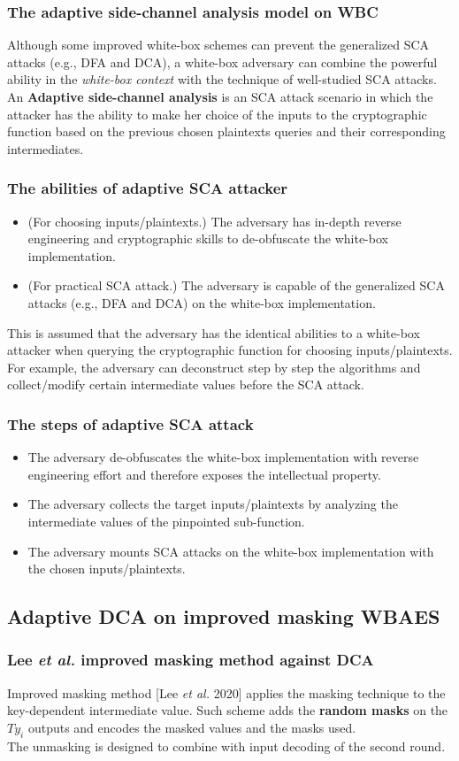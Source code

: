 \documentclass{beamer}
\begin{document}
\frame
{
	\frametitle{The adaptive side-channel analysis model on WBC}
	Although some improved white-box schemes can prevent the generalized SCA attacks (e.g., DFA and DCA), a white-box adversary can combine the powerful ability in the \textit{white-box context} with the technique of well-studied SCA attacks.
	\\[2ex]
	An \textbf{Adaptive side-channel analysis} is an SCA attack scenario in which the attacker has the ability
	to make her choice of the inputs to the cryptographic function based on the previous chosen plaintexts queries and their corresponding intermediates.
}

\frame
{
	\frametitle{The abilities of adaptive SCA attacker}
	\begin{itemize}
		\item (For choosing inputs/plaintexts.) The adversary has in-depth reverse engineering and cryptographic skills to de-obfuscate the white-box implementation.
		\item (For practical SCA attack.) The adversary is capable of the generalized SCA attacks (e.g., DFA and DCA) on the white-box implementation.
	\end{itemize}
	This is assumed that the adversary has the identical abilities to a white-box attacker when querying the cryptographic function for choosing inputs/plaintexts. For example, the adversary can deconstruct step by step the algorithms and collect/modify certain intermediate values before the SCA attack.
}

\frame
{
	\frametitle{The steps of adaptive SCA attack}
	\begin{itemize}
		\item The adversary de-obfuscates the white-box implementation with reverse engineering effort and therefore exposes the intellectual property.
		\item The adversary collects the target inputs/plaintexts by analyzing the intermediate values of the pinpointed sub-function.
		\item The adversary mounts SCA attacks on the white-box implementation with the chosen inputs/plaintexts.
	\end{itemize}
}


\subsection{Adaptive DCA on improved masking WBAES}

\frame
{
	\frametitle{Lee \textit{et al.} improved masking method against DCA}
	Improved masking method [Lee \textit{et al.} 2020] applies the masking technique to the key-dependent intermediate value. Such scheme adds the \textbf{random masks} on the $Ty_i$ outputs and encodes the masked values and the masks used.
	\\[2ex]
	The unmasking is designed to combine with input decoding of the second round.
}
\end{document}
